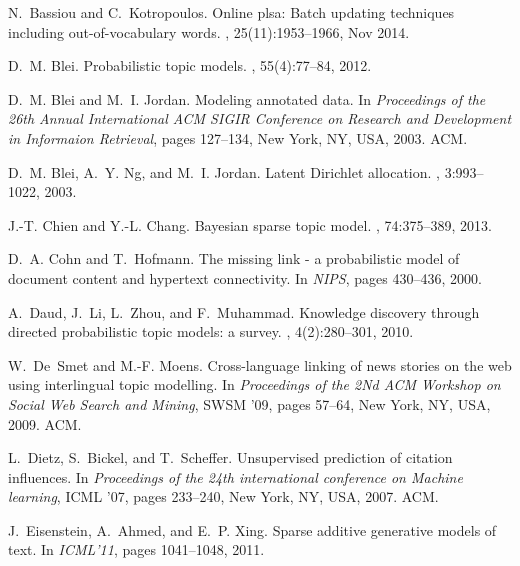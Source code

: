 \documentclass{sig-alternate}
\begin{document}
\begin{thebibliography}{10}

N.~Bassiou and C.~Kotropoulos.
\newblock Online plsa: Batch updating techniques including out-of-vocabulary
  words.
,
  25(11):1953--1966, Nov 2014.

D.~M. Blei.
\newblock Probabilistic topic models.
, 55(4):77--84, 2012.

D.~M. Blei and M.~I. Jordan.
\newblock Modeling annotated data.
\newblock In {\em Proceedings of the 26th Annual International ACM SIGIR
  Conference on Research and Development in Informaion Retrieval}, pages
  127--134, New York, NY, USA, 2003. ACM.

D.~M. Blei, A.~Y. Ng, and M.~I. Jordan.
\newblock Latent {Dirichlet} allocation.
, 3:993--1022, 2003.

J.-T. Chien and Y.-L. Chang.
\newblock Bayesian sparse topic model.
, 74:375--389, 2013.

D.~A. Cohn and T.~Hofmann.
\newblock The missing link - a probabilistic model of document content and
  hypertext connectivity.
\newblock In {\em NIPS}, pages 430--436, 2000.

A.~Daud, J.~Li, L.~Zhou, and F.~Muhammad.
\newblock Knowledge discovery through directed probabilistic topic models: a
  survey.
, 4(2):280--301, 2010.

W.~De~Smet and M.-F. Moens.
\newblock Cross-language linking of news stories on the web using interlingual
  topic modelling.
\newblock In {\em Proceedings of the 2Nd ACM Workshop on Social Web Search and
  Mining}, SWSM '09, pages 57--64, New York, NY, USA, 2009. ACM.

L.~Dietz, S.~Bickel, and T.~Scheffer.
\newblock Unsupervised prediction of citation influences.
\newblock In {\em Proceedings of the 24th international conference on Machine
  learning}, ICML '07, pages 233--240, New York, NY, USA, 2007. ACM.

J.~Eisenstein, A.~Ahmed, and E.~P. Xing.
\newblock Sparse additive generative models of text.
\newblock In {\em ICML'11}, pages 1041--1048, 2011.


\end{thebibliography}
\end{document}
